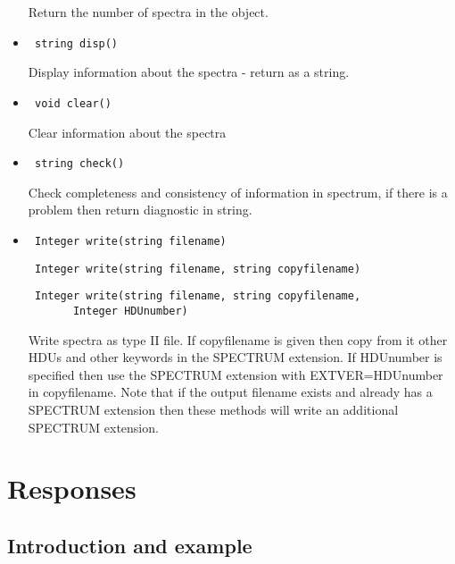 \documentclass[11pt]{book}
\begin{document}
\begin{itemize}
           Return the number of spectra in the object.

\item    \begin{verbatim} string disp() \end{verbatim}

           Display information about the spectra - return as a string.

\item    \begin{verbatim} void clear() \end{verbatim}

           Clear information about the spectra

\item    \begin{verbatim} string check() \end{verbatim}

           Check completeness and consistency of information in spectrum,
           if there is a problem then return diagnostic in string.

\item  \begin{verbatim} Integer write(string filename) \end{verbatim}
       \begin{verbatim} Integer write(string filename, string copyfilename) \end{verbatim}
       \begin{verbatim} Integer write(string filename, string copyfilename,
       Integer HDUnumber) \end{verbatim}

          Write spectra as type II file. If copyfilename is given then
          copy from it other HDUs and other keywords in the SPECTRUM
          extension. If HDUnumber is specified then use the SPECTRUM
          extension with EXTVER=HDUnumber in copyfilename. Note that 
          if the output filename exists and already has a SPECTRUM 
          extension then these methods will write an additional 
          SPECTRUM extension.

\end{itemize}

\section{Responses}

\subsection{Introduction and example}
\end{document}
